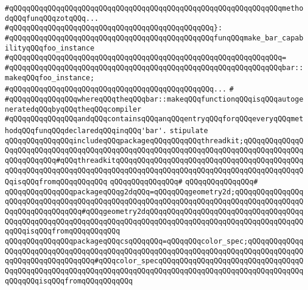 \verb|#qQQqqQQqqQQqqQQqqQQqqQQqqQQqqQQqqQQqqQQqqQQqqQQqqQQqqQQqqQQqqQQqmethodqQQqfunqQQqzotqQQq...|\newline
\verb|#qQQqqQQqqQQqqQQqqQQqqQQqqQQqqQQqqQQqqQQqqQQqqQQq}:|\newline
\verb|#qQQqqQQqqQQqqQQqqQQqqQQqqQQqqQQqqQQqqQQqqQQqqQQqfunqQQqmake_bar_capabilityqQQqfoo_instance|\newline
\verb|#qQQqqQQqqQQqqQQqqQQqqQQqqQQqqQQqqQQqqQQqqQQqqQQqqQQqqQQqqQQqqQQq=|\newline
\verb|#qQQqqQQqqQQqqQQqqQQqqQQqqQQqqQQqqQQqqQQqqQQqqQQqqQQqqQQqqQQqqQQqbar::makeqQQqfoo_instance;|\newline
\verb|#qQQqqQQqqQQqqQQqqQQqqQQqqQQqqQQqqQQqqQQqqQQqqQQq...|\newline
\verb|#|\newline
\verb|#qQQqqQQqqQQqqQQqwhereqQQqtheqQQqbar::makeqQQqfunctionqQQqisqQQqautogeneratedqQQqbyqQQqtheqQQqcompiler|\newline
\verb|#qQQqqQQqqQQqqQQqandqQQqcontainsqQQqanqQQqentryqQQqforqQQqeveryqQQqmethodqQQqfunqQQqdeclaredqQQqinqQQq'bar'.|\newline
\newline
\verb|stipulate|\newline
\verb|qQQqqQQqqQQqqQQqincludeqQQqpackageqQQqqQQqqQQqthreadkit;qQQqqQQqqQQqqQQqqQQqqQQqqQQqqQQqqQQqqQQqqQQqqQQqqQQqqQQqqQQqqQQqqQQqqQQqqQQqqQQqqQQqqQQqqQQqqQQq#qQQqthreadkitqQQqqQQqqQQqqQQqqQQqqQQqqQQqqQQqqQQqqQQqqQQqqQQqqQQqqQQqqQQqqQQqqQQqqQQqqQQqqQQqqQQqqQQqqQQqqQQqqQQqqQQqqQQqqQQqqQQqisqQQqfromqQQqqQQqqQQq|\newline
\verb|qQQqqQQqqQQqqQQq#|\newline
\verb|qQQqqQQqqQQqqQQq#|\newline
\verb|qQQqqQQqqQQqqQQqpackageqQQqg2dqQQq=qQQqqQQqgeometry2d;qQQqqQQqqQQqqQQqqQQqqQQqqQQqqQQqqQQqqQQqqQQqqQQqqQQqqQQqqQQqqQQqqQQqqQQqqQQqqQQqqQQqqQQqqQQqqQQqqQQqqQQq#qQQqgeometry2dqQQqqQQqqQQqqQQqqQQqqQQqqQQqqQQqqQQqqQQqqQQqqQQqqQQqqQQqqQQqqQQqqQQqqQQqqQQqqQQqqQQqqQQqqQQqqQQqqQQqqQQqqQQqqQQqisqQQqfromqQQqqQQqqQQq|\newline
\verb|qQQqqQQqqQQqqQQqpackageqQQqcsqQQqqQQq=qQQqqQQqcolor_spec;qQQqqQQqqQQqqQQqqQQqqQQqqQQqqQQqqQQqqQQqqQQqqQQqqQQqqQQqqQQqqQQqqQQqqQQqqQQqqQQqqQQqqQQqqQQqqQQqqQQqqQQq#qQQqcolor_specqQQqqQQqqQQqqQQqqQQqqQQqqQQqqQQqqQQqqQQqqQQqqQQqqQQqqQQqqQQqqQQqqQQqqQQqqQQqqQQqqQQqqQQqqQQqqQQqqQQqqQQqqQQqqQQqisqQQqfromqQQqqQQqqQQq|\newline
